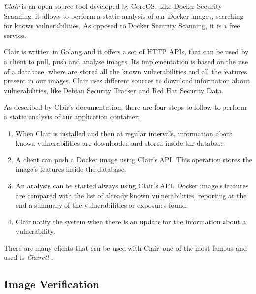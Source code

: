 \documentclass[a4paper,12pt]{article}
\begin{document}
\textit{Clair} \cite{clair} is an open source tool developed by CoreOS. Like
Docker Security Scanning, it allows to perform a static analysis of our Docker
images, searching for known vulnerabilities. As opposed to Docker Security
Scanning, it is a free service. \par Clair is written in Golang and it offers a
set of HTTP APIs, that can be used by a client to pull, push and analyse images.
Its implementation is based on the use of a database, where are stored all the
known vulnerabilities and all the features present in our images. Clair uses
different sources to download information about vulnerabilities, like Debian
Security Tracker and Red Hat Security Data. \par As described by Clair's
documentation, there are four steps to follow to perform a static analysis of
our application container:
\begin{enumerate}
  \item When Clair is installed and then at regular intervals, information about
  known vulnerabilities are downloaded and stored inside the database.
  \item A client can push a Docker image using Clair's API. This operation
  stores the image's features inside the database.
  \item An analysis can be started always using Clair's API. Docker image's
  features are compared with the list of already known vulnerabilities,
  reporting at the end a summary of the vulnerabilities or exposures found.
  \item Clair notify the system when there is an update for the information
  about a vulnerability.
\end{enumerate}
There are many clients that can be used with Clair, one of the most famous and
used is \textit{Clairctl} \cite{clairctl}.

\subsection{Image Verification}
\end{document}
